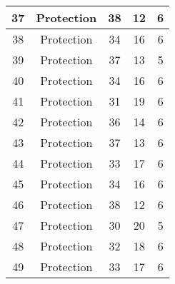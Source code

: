 \documentclass[results.tex]{subfiles}
\begin{document}
\begin{center}
\begin{tabular}{| c || c | c | c | c |}
            \hline
            37                      & Protection                   & 38                     & 12                      & 6                    \\
            \hline
            38                      & Protection                   & 34                     & 16                      & 6                    \\
            \hline
            39                      & Protection                   & 37                     & 13                      & 5                    \\
            \hline
            40                      & Protection                   & 34                     & 16                      & 6                    \\
            \hline
            41                      & Protection                   & 31                     & 19                      & 6                    \\
            \hline
            42                      & Protection                   & 36                     & 14                      & 6                    \\
            \hline
            43                      & Protection                   & 37                     & 13                      & 6                    \\
            \hline
            44                      & Protection                   & 33                     & 17                      & 6                    \\
            \hline
            45                      & Protection                   & 34                     & 16                      & 6                    \\
            \hline
            46                      & Protection                   & 38                     & 12                      & 6                    \\
            \hline
            47                      & Protection                   & 30                     & 20                      & 5                    \\
            \hline
            48                      & Protection                   & 32                     & 18                      & 6                    \\
            \hline
            49                      & Protection                   & 33                     & 17                      & 6                    \\
            \hline
        \end{tabular}
    \end{center}
\end{document}

